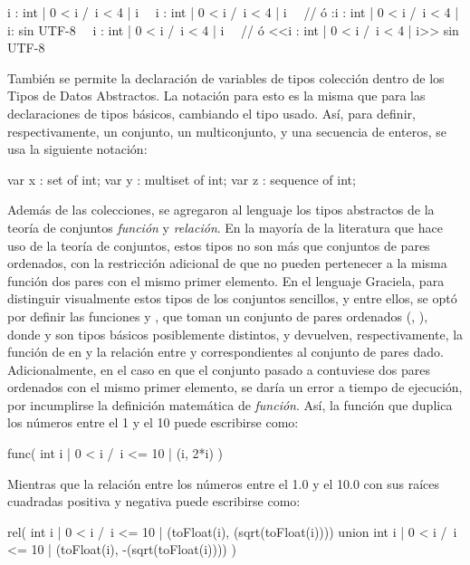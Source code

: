 \begin{gracielacode}
{i : int | 0 < i /\ i < 4 | i}
~\Lbag~i : int | 0 < i /\ i < 4 | i~\Rbag~
  // ó {:i : int | 0 < i /\ i < 4 | i:} sin UTF-8
~\Lseq~i : int | 0 < i /\ i < 4 | i~\Rseq~
  // ó <<i : int | 0 < i /\ i < 4 | i>> sin UTF-8
\end{gracielacode}

También se permite la declaración de variables de tipos colección dentro de los
Tipos de Datos Abstractos. La notación para esto es la misma que para las
declaraciones de tipos básicos, cambiando el tipo usado. Así, para definir,
respectivamente, un conjunto, un multiconjunto, y una secuencia de enteros, se
usa la siguiente notación:

\begin{gracielacode}
var x : set of int;
var y : multiset of int;
var z : sequence of int;
\end{gracielacode}

Además de las colecciones, se agregaron al lenguaje los tipos abstractos de la
teoría de conjuntos \textit{función} y \textit{relación}. En la mayoría de la
literatura que hace uso de la teoría de conjuntos, estos tipos no son más que
conjuntos de pares ordenados, con la restricción adicional de que no pueden
pertenecer a la misma función dos pares con el mismo primer elemento. En el
lenguaje Graciela, para distinguir visualmente estos tipos de los conjuntos
sencillos, y entre ellos, se optó por definir las funciones  y
, que toman un conjunto de pares ordenados (, ),
donde  y  son tipos básicos posiblemente distintos, y
devuelven, respectivamente, la función de  en  y la relación
entre  y  correspondientes al conjunto de pares dado.
Adicionalmente, en el caso en que el conjunto pasado a  contuviese
dos pares ordenados con el mismo primer elemento, se daría un error a tiempo de
ejecución, por incumplirse la definición matemática de \textit{función}. Así, la
función que duplica los números entre el 1 y el 10 puede escribirse como:

\begin{gracielacode}
func({ int i | 0 < i /\ i <= 10 | (i, 2*i) })
\end{gracielacode}

Mientras que la relación entre los números entre el 1.0 y el 10.0 con sus raíces
cuadradas positiva y negativa puede escribirse como:

\begin{gracielacode}
rel(
  { int i | 0 < i /\ i <= 10 |
    (toFloat(i),  (sqrt(toFloat(i))))
  } union
  { int i | 0 < i /\ i <= 10 |
    (toFloat(i), -(sqrt(toFloat(i))))
  }
)
\end{gracielacode}


